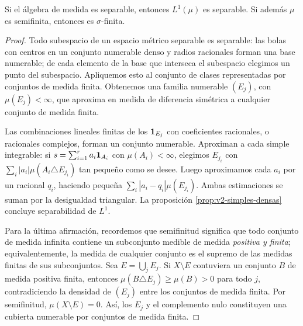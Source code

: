 \begin{teorema}\label{teo:v2-medida-separable}
Si el álgebra de medida es separable, entonces $L^1(\mu)$ es separable. Si además $\mu$ es semifinita, entonces es $\sigma$-finita.
\end{teorema}
\begin{proof}
Todo subespacio de un espacio métrico separable es separable: las bolas con centros en un conjunto numerable denso y radios racionales forman una base numerable; de cada elemento de la base que interseca el subespacio elegimos un punto del subespacio. Apliquemos esto al conjunto de clases representadas por conjuntos de medida finita. Obtenemos una familia numerable $(E_j)$, con $\mu(E_j)<\infty$, que aproxima en medida de diferencia simétrica a cualquier conjunto de medida finita.

Las combinaciones lineales finitas de los $\mathbf1_{E_j}$ con coeficientes racionales, o racionales complejos, forman un conjunto numerable. Aproximan a cada simple integrable: si $s=\sum_{i=1}^ra_i\mathbf1_{A_i}$ con $\mu(A_i)<\infty$, elegimos $E_{j_i}$ con $\sum_i|a_i|\mu(A_i\triangle E_{j_i})$ tan pequeño como se desee. Luego aproximamos cada $a_i$ por un racional $q_i$, haciendo pequeña $\sum_i|a_i-q_i|\mu(E_{j_i})$. Ambas estimaciones se suman por la desigualdad triangular. La proposición \ref{prop:v2-simples-densas} concluye separabilidad de $L^1$.

Para la última afirmación, recordemos que semifinitud significa que todo conjunto de medida infinita contiene un subconjunto medible de medida \emph{positiva y finita}; equivalentemente, la medida de cualquier conjunto es el supremo de las medidas finitas de sus subconjuntos. Sea $E=\bigcup_jE_j$. Si $X\setminus E$ contuviera un conjunto $B$ de medida positiva finita, entonces $\mu(B\triangle E_j)\ge\mu(B)>0$ para todo $j$, contradiciendo la densidad de $(E_j)$ entre los conjuntos de medida finita. Por semifinitud, $\mu(X\setminus E)=0$. Así, los $E_j$ y el complemento nulo constituyen una cubierta numerable por conjuntos de medida finita.
\end{proof}

